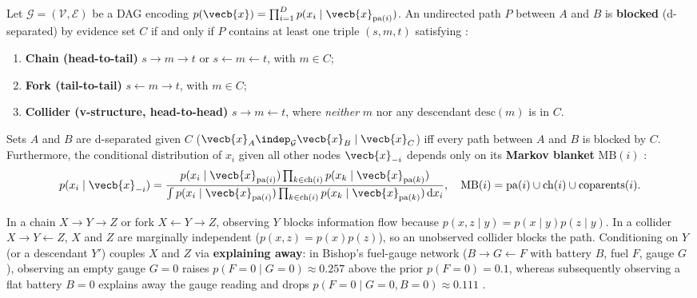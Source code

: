 \documentclass[../../../../master.tex]{subfiles}
\begin{document}
\begin{coremath}
\label{thm:pgmgp:dsep}
Let $\mathcal{G} = (\mathcal{V}, \mathcal{E})$ be a DAG encoding $p(\vecb{x}) = \prod_{i=1}^D p(x_i \mid \vecb{x}_{\mathrm{pa}(i)})$. An undirected path $P$ between $A$ and $B$ is \textbf{blocked} (d-separated) by evidence set $C$ if and only if $P$ contains at least one triple $(s, m, t)$ satisfying  :
\begin{enumerate}
  \item \textbf{Chain (head-to-tail)} $s \to m \to t$ or $s \leftarrow m \leftarrow t$, with $m \in C$;
  \item \textbf{Fork (tail-to-tail)} $s \leftarrow m \to t$, with $m \in C$;
  \item \textbf{Collider (v-structure, head-to-head)} $s \to m \leftarrow t$, where \emph{neither} $m$ nor any descendant $\mathrm{desc}(m)$ is in $C$.
\end{enumerate}
Sets $A$ and $B$ are d-separated given $C$ ($\vecb{x}_A \indep_{\mathcal{G}} \vecb{x}_B \mid \vecb{x}_C$) iff every path between $A$ and $B$ is blocked by $C$. Furthermore, the conditional distribution of $x_i$ given all other nodes $\vecb{x}_{-i}$ depends only on its \textbf{Markov blanket} $\mathrm{MB}(i)$  :
\begin{equation}
\label{eq:pgmgp:markov_blanket}
p(x_i \mid \vecb{x}_{-i})
= \frac{p(x_i \mid \vecb{x}_{\mathrm{pa}(i)}) \prod_{k \in \mathrm{ch}(i)} p(x_k \mid \vecb{x}_{\mathrm{pa}(k)})}{\int p(x_i \mid \vecb{x}_{\mathrm{pa}(i)}) \prod_{k \in \mathrm{ch}(i)} p(x_k \mid \vecb{x}_{\mathrm{pa}(k)})\,\mathrm{d}x_i},
\quad
\mathrm{MB}(i) = \mathrm{pa}(i) \cup \mathrm{ch}(i) \cup \mathrm{coparents}(i).
\end{equation}
\end{coremath}

\begin{intuition}
In a chain $X \to Y \to Z$ or fork $X \leftarrow Y \to Z$, observing $Y$ blocks information flow because $p(x, z \mid y) = p(x \mid y)p(z \mid y)$. In a collider $X \to Y \leftarrow Z$, $X$ and $Z$ are marginally independent ($p(x, z) = p(x)p(z)$), so an unobserved collider blocks the path. Conditioning on $Y$ (or a descendant $Y'$) couples $X$ and $Z$ via \textbf{explaining away}: in Bishop's fuel-gauge network ($B \to G \leftarrow F$ with battery $B$, fuel $F$, gauge $G$), observing an empty gauge $G=0$ raises $p(F=0 \mid G=0) \approx 0.257$ above the prior $p(F=0)=0.1$, whereas subsequently observing a flat battery $B=0$ explains away the gauge reading and drops $p(F=0 \mid G=0, B=0) \approx 0.111$ .
\end{intuition}
\end{document}
